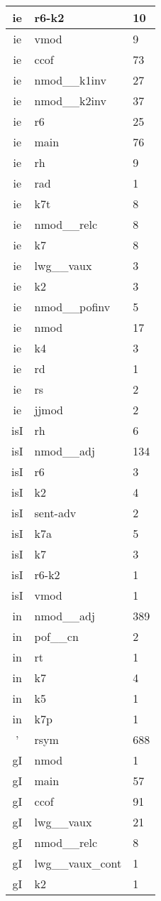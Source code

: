 \documentclass[a4 paper]{article}
\begin{document}
\begin{longtable}{cp{}p{}}
ie & r6-k2 & 10\\ \midrule ie & vmod & 9\\ \midrule ie & ccof & 73\\ \midrule ie & nmod\_\_k1inv & 27\\ \midrule ie & nmod\_\_k2inv & 37\\ \midrule ie & r6 & 25\\ \midrule ie & main & 76\\ \midrule ie & rh & 9\\ \midrule ie & rad & 1\\ \midrule ie & k7t & 8\\ \midrule ie & nmod\_\_relc & 8\\ \midrule ie & k7 & 8\\ \midrule ie & lwg\_\_vaux & 3\\ \midrule ie & k2 & 3\\ \midrule ie & nmod\_\_pofinv & 5\\ \midrule ie & nmod & 17\\ \midrule ie & k4 & 3\\ \midrule ie & rd & 1\\ \midrule ie & rs & 2\\ \midrule ie & jjmod & 2\\ \midrule 
isI & rh & 6\\ \midrule isI & nmod\_\_adj & 134\\ \midrule isI & r6 & 3\\ \midrule isI & k2 & 4\\ \midrule isI & sent-adv & 2\\ \midrule isI & k7a & 5\\ \midrule isI & k7 & 3\\ \midrule isI & r6-k2 & 1\\ \midrule isI & vmod & 1\\ \midrule 
in & nmod\_\_adj & 389\\ \midrule in & pof\_\_cn & 2\\ \midrule in & rt & 1\\ \midrule in & k7 & 4\\ \midrule in & k5 & 1\\ \midrule in & k7p & 1\\ \midrule 
' & rsym & 688\\ \midrule 
gI & nmod & 1\\ \midrule gI & main & 57\\ \midrule gI & ccof & 91\\ \midrule gI & lwg\_\_vaux & 21\\ \midrule gI & nmod\_\_relc & 8\\ \midrule gI & lwg\_\_vaux\_cont & 1\\ \midrule gI & k2 & 1\\ \midrule 

\end{longtable}
\end{document}
